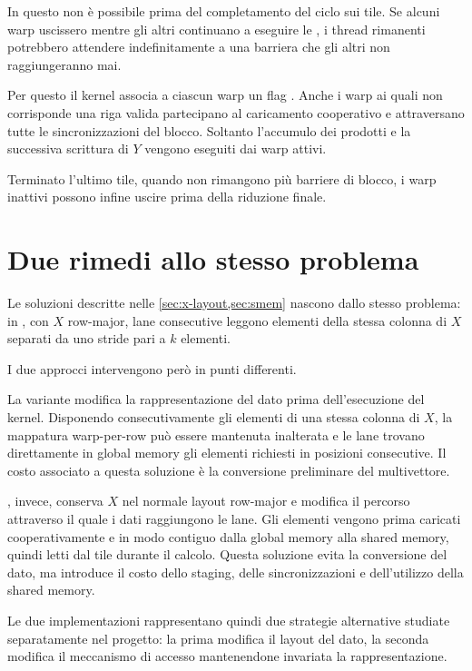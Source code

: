 In  questo non è possibile prima del
completamento del ciclo sui tile. Se alcuni warp uscissero mentre gli
altri continuano a eseguire le , i thread
rimanenti potrebbero attendere indefinitamente a una barriera che gli
altri non raggiungeranno mai.

Per questo il kernel associa a ciascun warp un flag .
Anche i warp ai quali non corrisponde una riga valida partecipano al
caricamento cooperativo e attraversano tutte le sincronizzazioni del
blocco. Soltanto l'accumulo dei prodotti e la successiva scrittura di
$Y$ vengono eseguiti dai warp attivi.

Terminato l'ultimo tile, quando non rimangono più barriere di blocco,
i warp inattivi possono infine uscire prima della riduzione finale.

\section{Due rimedi allo stesso problema}
\label{sec:due-rimedi}

Le soluzioni descritte nelle \cref{sec:x-layout,sec:smem} nascono dallo
stesso problema: in , con $X$ row-major, lane
consecutive leggono elementi della stessa colonna di $X$ separati da uno
stride pari a $k$ elementi.

I due approcci intervengono però in punti differenti.

La variante  modifica la rappresentazione del dato
prima dell'esecuzione del kernel. Disponendo consecutivamente gli elementi
di una stessa colonna di $X$, la mappatura warp-per-row può essere mantenuta
inalterata e le lane trovano direttamente in global memory gli elementi
richiesti in posizioni consecutive. Il costo associato a questa soluzione
è la conversione preliminare del multivettore.

, invece, conserva $X$ nel normale layout
row-major e modifica il percorso attraverso il quale i dati raggiungono le
lane. Gli elementi vengono prima caricati cooperativamente e in modo
contiguo dalla global memory alla shared memory, quindi letti dal tile
durante il calcolo. Questa soluzione evita la conversione del dato, ma
introduce il costo dello staging, delle sincronizzazioni e dell'utilizzo
della shared memory.

Le due implementazioni rappresentano quindi due strategie alternative
studiate separatamente nel progetto: la prima modifica il layout del dato,
la seconda modifica il meccanismo di accesso mantenendone invariata la
rappresentazione.

